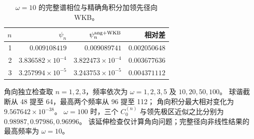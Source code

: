 \begin{table}[htbp]\centering
\caption{$\omega=10$ 的完整谱相位与精确角积分加领先径向 WKB。}
\begin{tabular}{rrrr}\toprule $n$ & $\psi_n$ & $\psi_n^{\rm ang+WKB}$ & 相对差\\\midrule
1 & $0.009108419$ & $0.009089741$ & $0.002050648$\\
2 & $3.836582\times10^{-4}$ & $3.822473\times10^{-4}$ & $0.003677636$\\
3 & $3.257994\times10^{-5}$ & $3.243753\times10^{-5}$ & $0.004371112$\\
\bottomrule\end{tabular}\end{table}
角向独立检查取 $n=1,2,3$，频率依次为 $\omega=1,2,3,5$ 及 $10,20,50,100$。
球谐截断从 48 提至 64，最高两个频率从 96 提至 112；
角向积分最大相对变化为 $9.567642\times10^{-38}$。
$\omega=100$ 时，三个 $C_0^{(n)}$ 与领先极区近似之比分别为 $0.98987,0.97986,0.96996$。
该延伸检查仅计算角向问题；完整径向非线性结果的最高频率为 $\omega=10$。
